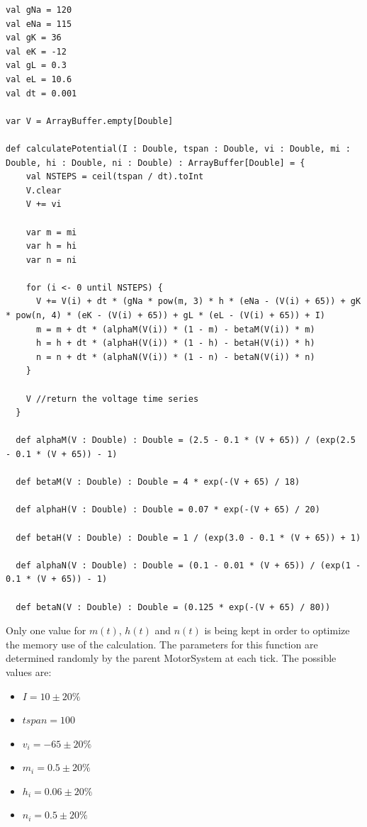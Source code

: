 \documentclass[titlepage]{article}
\begin{document}
\begin{lstlisting}
val gNa = 120
val eNa = 115
val gK = 36
val eK = -12
val gL = 0.3
val eL = 10.6
val dt = 0.001

var V = ArrayBuffer.empty[Double]

def calculatePotential(I : Double, tspan : Double, vi : Double, mi : Double, hi : Double, ni : Double) : ArrayBuffer[Double] = {  
    val NSTEPS = ceil(tspan / dt).toInt
    V.clear
    V += vi
    
    var m = mi
    var h = hi
    var n = ni
    
    for (i <- 0 until NSTEPS) {
      V += V(i) + dt * (gNa * pow(m, 3) * h * (eNa - (V(i) + 65)) + gK * pow(n, 4) * (eK - (V(i) + 65)) + gL * (eL - (V(i) + 65)) + I)
      m = m + dt * (alphaM(V(i)) * (1 - m) - betaM(V(i)) * m)
      h = h + dt * (alphaH(V(i)) * (1 - h) - betaH(V(i)) * h)
      n = n + dt * (alphaN(V(i)) * (1 - n) - betaN(V(i)) * n)
    }
        
    V //return the voltage time series
  }
  
  def alphaM(V : Double) : Double = (2.5 - 0.1 * (V + 65)) / (exp(2.5 - 0.1 * (V + 65)) - 1)
  
  def betaM(V : Double) : Double = 4 * exp(-(V + 65) / 18)

  def alphaH(V : Double) : Double = 0.07 * exp(-(V + 65) / 20)
  
  def betaH(V : Double) : Double = 1 / (exp(3.0 - 0.1 * (V + 65)) + 1)
  
  def alphaN(V : Double) : Double = (0.1 - 0.01 * (V + 65)) / (exp(1 - 0.1 * (V + 65)) - 1)
  
  def betaN(V : Double) : Double = (0.125 * exp(-(V + 65) / 80))
\end{lstlisting}
Only one value for $m(t)$, $h(t)$ and $n(t)$ is being kept in order to optimize the memory use of the calculation. The parameters for this function are determined randomly by the parent MotorSystem at each tick. The possible values are:
\begin{itemize}
\item $I = 10 \pm 20\%$
\item $tspan = 100$
\item $v_i = -65 \pm 20\%$
\item $m_i = 0.5 \pm 20\%$
\item $h_i = 0.06 \pm 20\%$
\item $n_i = 0.5 \pm 20\%$
\end{itemize}
\end{document}
